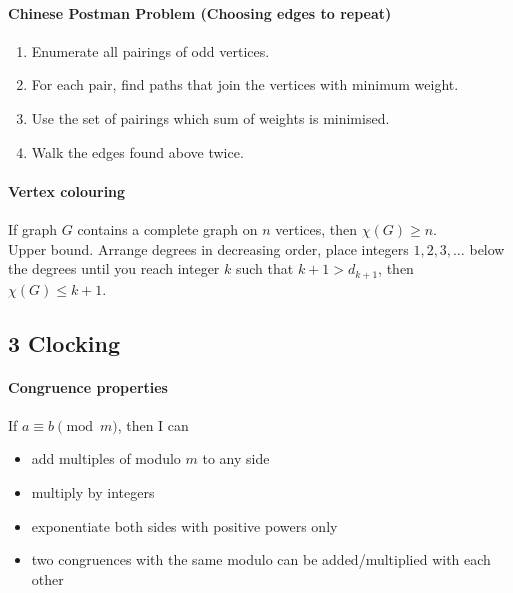 \documentclass[11pt,twocolumn]{scrartcl}
\begin{document}
\paragraph{Chinese Postman Problem (Choosing edges to repeat)}
\begin{enumerate}
    \item Enumerate all pairings of odd vertices.
    \item For each pair, find paths that join the vertices with minimum weight.
    \item Use the set of pairings which sum of weights is minimised.
    \item Walk the edges found above twice.
\end{enumerate}

\paragraph{Vertex colouring}
If graph $G$ contains a complete graph on $n$ vertices, then $\chi(G) \ge n$.\\
Upper bound. Arrange degrees in decreasing order, place integers $1,2,3,\dots$ below the degrees until you reach integer $k$ such that $k+1 > d_{k+1}$, then $\chi(G) \le k+1$.

\subsection*{3 Clocking}
\paragraph{Congruence properties} If $a\equiv b\pmod{m}$, then I can
\begin{itemize}
    \item add multiples of modulo $m$ to any side
    \item multiply by integers
    \item exponentiate both sides with positive powers only
    \item two congruences with the same modulo can be added/multiplied with each other
\end{itemize}
\end{document}
